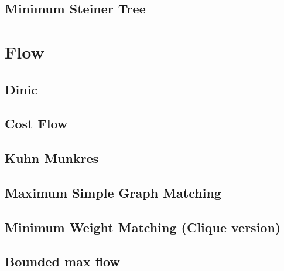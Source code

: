 \documentclass[a4paper,10pt,twocolumn,oneside]{article}
\begin{document}
\subsection{Minimum Steiner Tree}


\section{Flow}
%

\subsection{Dinic} %


\subsection{Cost Flow} %


\subsection{Kuhn Munkres}


\subsection{Maximum Simple Graph Matching}


\subsection{Minimum Weight Matching (Clique version)}


% 

\subsection{Bounded max flow}

\end{document}
